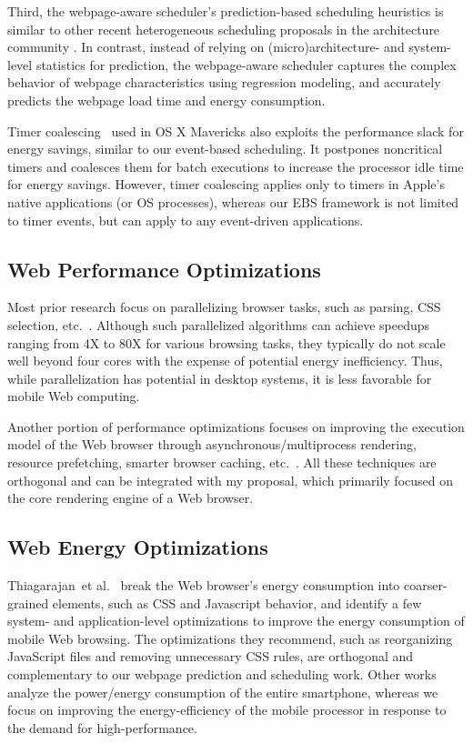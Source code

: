 Third, the webpage-aware scheduler's prediction-based scheduling heuristics is similar to other recent heterogeneous scheduling proposals in the architecture community \cite{PIE,compositecores,tracephase,tm}. In contrast, instead of relying on (micro)architecture- and system-level statistics for prediction, the webpage-aware scheduler captures the complex behavior of webpage characteristics using regression modeling, and accurately predicts the webpage load time and energy consumption.

Timer coalescing~\cite{powerinosx} used in OS X Mavericks also exploits the performance slack for energy savings, similar to our event-based scheduling. It postpones noncritical timers and coalesces them for batch executions to increase the processor idle time for energy savings. However, timer coalescing applies only to timers in Apple's native applications (or OS processes), whereas our EBS framework is not limited to timer events, but can apply to any event-driven applications.

\subsection{Web Performance Optimizations}
\label{sec:runtime:related:perf}

Most prior research focus on parallelizing browser tasks, such as parsing, CSS selection, etc.~\cite{ParallelBrowser,FTL,UCI,Parabix}. Although such parallelized algorithms can achieve speedups ranging from 4X to 80X for various browsing tasks, they typically do not scale well beyond four cores with the expense of potential energy inefficiency. Thus, while parallelization has potential in desktop systems, it is less favorable for mobile Web computing.

Another portion of performance optimizations focuses on improving the execution model of the Web browser through asynchronous/multiprocess rendering, resource prefetching, smarter browser caching, etc.~\cite{pocketweb,Adrenaline,smart-caching,webkit2,firefox-spec_parsing}. All these techniques are orthogonal and can be integrated with my proposal, which primarily focused on the core rendering engine of a Web browser.

\subsection{Web Energy Optimizations}
\label{sec:runtime:related:energy}

Thiagarajan~et al.~\cite{www-battery} break the Web browser's energy consumption into coarser-grained elements, such as CSS and Javascript behavior, and identify a few system- and application-level optimizations to improve the energy consumption of mobile Web browsing.  The optimizations they recommend, such as reorganizing JavaScript files and removing unnecessary CSS rules, are orthogonal and complementary to our webpage prediction and scheduling work. Other works analyze the power/energy consumption of the entire smartphone\cite{Carroll,eprof,JamesHotchip}, whereas we focus on improving the energy-efficiency of the mobile processor in response to the demand for high-performance.

